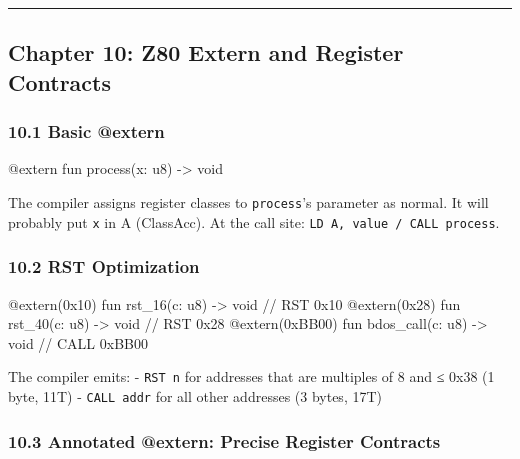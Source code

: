 \documentclass[
  11pt,
]{article}
\newenvironment{Shaded}{\begin{snugshade}}{\end{snugshade}}
\newcommand{\NormalTok}[1]{#1}
\begin{document}
\begin{center}\rule{0.5\linewidth}{0.5pt}\end{center}

\hypertarget{chapter-10-z80-extern-and-register-contracts}{%
\subsection{Chapter 10: Z80 Extern and Register
Contracts}\label{chapter-10-z80-extern-and-register-contracts}}

\hypertarget{basic-extern}{%
\subsubsection{10.1 Basic @extern}\label{basic-extern}}

\begin{Shaded}
\begin{Highlighting}[]
\NormalTok{@extern fun process(x: u8) {-}\textgreater{} void}
\end{Highlighting}
\end{Shaded}

The compiler assigns register classes to \texttt{process}'s parameter as
normal. It will probably put \texttt{x} in A (ClassAcc). At the call
site: \texttt{LD\ A,\ value\ /\ CALL\ process}.

\hypertarget{rst-optimization}{%
\subsubsection{10.2 RST Optimization}\label{rst-optimization}}

\begin{Shaded}
\begin{Highlighting}[]
\NormalTok{@extern(0x10) fun rst\_16(c: u8) {-}\textgreater{} void   // RST 0x10}
\NormalTok{@extern(0x28) fun rst\_40(c: u8) {-}\textgreater{} void   // RST 0x28}
\NormalTok{@extern(0xBB00) fun bdos\_call(c: u8) {-}\textgreater{} void  // CALL 0xBB00}
\end{Highlighting}
\end{Shaded}

The compiler emits: - \texttt{RST\ n} for addresses that are multiples
of 8 and ≤ 0x38 (1 byte, 11T) - \texttt{CALL\ addr} for all other
addresses (3 bytes, 17T)

\hypertarget{annotated-extern-precise-register-contracts}{%
\subsubsection{10.3 Annotated @extern: Precise Register
Contracts}\label{annotated-extern-precise-register-contracts}}
\end{document}
